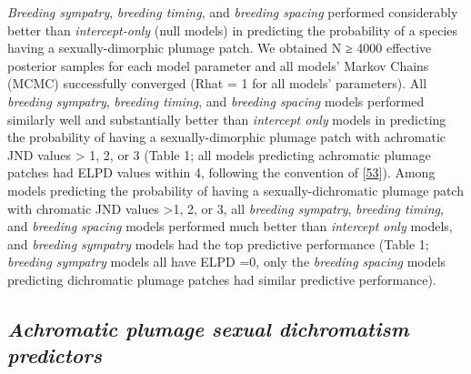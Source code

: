 \documentclass[
  a4paper,
]{article}
\begin{document}
\emph{Breeding sympatry}, \emph{breeding timing}, and \emph{breeding
spacing} performed considerably better than \emph{intercept-only} (null
models) in predicting the probability of a species having a
sexually-dimorphic plumage patch. We obtained N ≥ 4000 effective
posterior samples for each model parameter and all models' Markov Chains
(MCMC) successfully converged (Rhat = 1 for all models' parameters). All
\emph{breeding sympatry}, \emph{breeding timing}, and \emph{breeding
spacing} models performed similarly well and substantially better than
\emph{intercept only} models in predicting the probability of having a
sexually-dimorphic plumage patch with achromatic JND values
\textgreater{} 1, 2, or 3 (Table 1; all models predicting achromatic
plumage patches had ELPD values within 4, following the convention of
{[}\protect\hyperlink{ref-burnham2002}{53}{]}). Among models predicting
the probability of having a sexually-dichromatic plumage patch with
chromatic JND values \textgreater1, 2, or 3, all \emph{breeding
sympatry}, \emph{breeding timing}, and \emph{breeding spacing} models
performed much better than \emph{intercept only} models, and
\emph{breeding sympatry} models had the top predictive performance
(Table 1; \emph{breeding sympatry} models all have ELPD =0, only the
\emph{breeding spacing} models predicting dichromatic plumage patches
had similar predictive performance).

\hypertarget{achromatic-plumage-sexual-dichromatism-predictors}{%
\subsection{\texorpdfstring{\emph{Achromatic plumage sexual dichromatism
predictors}}{Achromatic plumage sexual dichromatism predictors}}\label{achromatic-plumage-sexual-dichromatism-predictors}}
\end{document}
